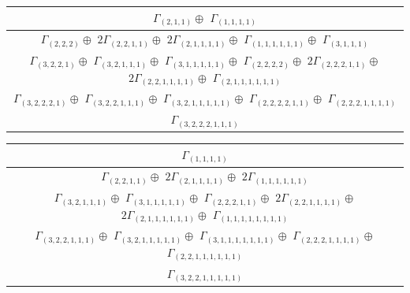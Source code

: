 \documentclass[main.tex]{subfiles}
\begin{document}
\begin{minipage}{1\textwidth}
\centering
\begin{tabular}{c}
$\Gamma_{(
2 , 
1 , 
1
)} \oplus$
$\Gamma_{(
1 , 
1 , 
1 , 
1
)}$
\\ \hline
$\Gamma_{(
2 , 
2 , 
2
)} \oplus$
$ 2 \Gamma_{(
2 , 
2 , 
1 , 
1
)} \oplus$
$ 2 \Gamma_{(
2 , 
1 , 
1 , 
1 , 
1
)} \oplus$
$\Gamma_{(
1 , 
1 , 
1 , 
1 , 
1 , 
1
)} \oplus$
$\Gamma_{(
3 , 
1 , 
1 , 
1
)}$
\\ \hline
$\Gamma_{(
3 , 
2 , 
2 , 
1
)} \oplus$
$\Gamma_{(
3 , 
2 , 
1 , 
1 , 
1
)} \oplus$
$\Gamma_{(
3 , 
1 , 
1 , 
1 , 
1 , 
1
)} \oplus$
$\Gamma_{(
2 , 
2 , 
2 , 
2
)} \oplus$
$ 2 \Gamma_{(
2 , 
2 , 
2 , 
1 , 
1
)} \oplus$
$ 2 \Gamma_{(
2 , 
2 , 
1 , 
1 , 
1 , 
1
)} \oplus$
$\Gamma_{(
2 , 
1 , 
1 , 
1 , 
1 , 
1 , 
1
)}$
\\ \hline
$\Gamma_{(
3 , 
2 , 
2 , 
2 , 
1
)} \oplus$
$\Gamma_{(
3 , 
2 , 
2 , 
1 , 
1 , 
1
)} \oplus$
$\Gamma_{(
3 , 
2 , 
1 , 
1 , 
1 , 
1 , 
1
)} \oplus$
$\Gamma_{(
2 , 
2 , 
2 , 
2 , 
1 , 
1
)} \oplus$
$\Gamma_{(
2 , 
2 , 
2 , 
1 , 
1 , 
1 , 
1
)}$
\\ \hline
$\Gamma_{(
3 , 
2 , 
2 , 
2 , 
1 , 
1 , 
1
)}$
\\
\end{tabular}\end{minipage}
\bigskip
\begin{minipage}{1\textwidth}
\centering
\begin{tabular}{c}
$\Gamma_{(
1 , 
1 , 
1 , 
1
)}$
\\ \hline
$\Gamma_{(
2 , 
2 , 
1 , 
1
)} \oplus$
$ 2 \Gamma_{(
2 , 
1 , 
1 , 
1 , 
1
)} \oplus$
$ 2 \Gamma_{(
1 , 
1 , 
1 , 
1 , 
1 , 
1
)}$
\\ \hline
$\Gamma_{(
3 , 
2 , 
1 , 
1 , 
1
)} \oplus$
$\Gamma_{(
3 , 
1 , 
1 , 
1 , 
1 , 
1
)} \oplus$
$\Gamma_{(
2 , 
2 , 
2 , 
1 , 
1
)} \oplus$
$ 2 \Gamma_{(
2 , 
2 , 
1 , 
1 , 
1 , 
1
)} \oplus$
$ 2 \Gamma_{(
2 , 
1 , 
1 , 
1 , 
1 , 
1 , 
1
)} \oplus$
$\Gamma_{(
1 , 
1 , 
1 , 
1 , 
1 , 
1 , 
1 , 
1
)}$
\\ \hline
$\Gamma_{(
3 , 
2 , 
2 , 
1 , 
1 , 
1
)} \oplus$
$\Gamma_{(
3 , 
2 , 
1 , 
1 , 
1 , 
1 , 
1
)} \oplus$
$\Gamma_{(
3 , 
1 , 
1 , 
1 , 
1 , 
1 , 
1 , 
1
)} \oplus$
$\Gamma_{(
2 , 
2 , 
2 , 
1 , 
1 , 
1 , 
1
)} \oplus$
$\Gamma_{(
2 , 
2 , 
1 , 
1 , 
1 , 
1 , 
1 , 
1
)}$
\\ \hline
$\Gamma_{(
3 , 
2 , 
2 , 
1 , 
1 , 
1 , 
1 , 
1
)}$
\\
\end{tabular}\end{minipage}
\end{document}
